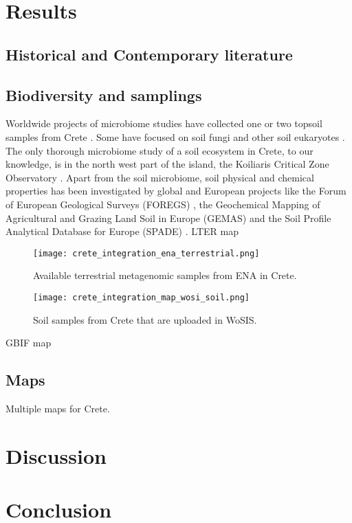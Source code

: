 \section{Results}\label{crete_idea_results}

\subsection{Historical and Contemporary literature}


\subsection{Biodiversity and samplings}

Worldwide projects of microbiome studies have collected one or two topsoil
samples from Crete \parencite{Vasar2022, Labouyrie2023, Bahram2018, Orgiazzi2018}.
Some have focused on soil fungi \parencite{Mikryukov2023, Davison2021, Tedersoo2021}
and other soil eukaryotes \parencite{Aslani2022}.
The only thorough microbiome study of a soil ecosystem in Crete, to our knowledge,
is in the north west part of the island, the Koiliaris Critical Zone Observatory \parencite{tsiknia2014}.
Apart from the soil microbiome, soil physical and chemical properties has been
investigated by global and European projects like the Forum of European Geological Surveys
(FOREGS) \parencite{nerc19017}, the Geochemical Mapping of Agricultural and Grazing Land
Soil in Europe (GEMAS) \parencite{REIMANN2018302} and the Soil Profile Analytical
Database for Europe (SPADE) \parencite{Hiederer2006}.
LTER map

\begin{figure}[h] 
    \centering\texttt{[image: crete\_integration\_ena\_terrestrial.png]}
    \caption{Available terrestrial metagenomic samples from ENA in Crete.}
    \label{fig:isd_crete_ena}
\end{figure}


\begin{figure}[h] 
    \centering\texttt{[image: crete\_integration\_map\_wosi\_soil.png]}
    \caption{Soil samples from Crete that are uploaded in WoSIS.}
    \label{fig:isd_crete_wosis}
\end{figure}

GBIF map 


\subsection{Maps}

Multiple maps for Crete.


\section{Discussion}\label{crete_idea_discussion}

\section{Conclusion}



